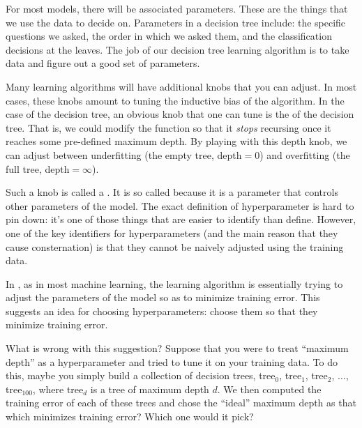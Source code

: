 For most models, there will be associated parameters.  These are the
things that we use the data to decide on.  Parameters in a decision
tree include: the specific questions we asked, the order in which we
asked them, and the classification decisions at the leaves.  The job
of our decision tree learning algorithm  is to take data
and figure out a good set of parameters.

Many learning algorithms will have additional knobs that you can
adjust.  In most cases, these knobs amount to tuning the inductive
bias of the algorithm.  In the case of the decision tree, an obvious
knob that one can tune is the  of the decision
tree.  That is, we could modify the  function so that it
\emph{stops} recursing once it reaches some pre-defined maximum depth.
By playing with this depth knob, we can adjust between underfitting
(the empty tree, depth$=0$) and overfitting (the full tree,
depth$=\infty$).


Such a knob is called a .  It is so called
because it is a parameter that controls other parameters of the model.
The exact definition of hyperparameter is hard to pin down: it's one
of those things that are easier to identify than define.  However, one
of the key identifiers for hyperparameters (and the main reason that
they cause consternation) is that they cannot be naively adjusted
using the training data.

In , as in most machine learning, the learning algorithm
is essentially trying to adjust the parameters of the model so as to
minimize training error.  This suggests an idea for choosing
hyperparameters: choose them so that they minimize training error.

What is wrong with this suggestion?  Suppose that you were to treat
``maximum depth'' as a hyperparameter and tried to tune it on your
training data.  To do this, maybe you simply build a collection of
decision trees, tree$_0$, tree$_1$, tree$_2$, $\dots$, tree$_{100}$,
where tree$_d$ is a tree of maximum depth $d$.  We then computed the
training error of each of these trees and chose the ``ideal'' maximum
depth as that which minimizes training error?  Which one would it
pick?

